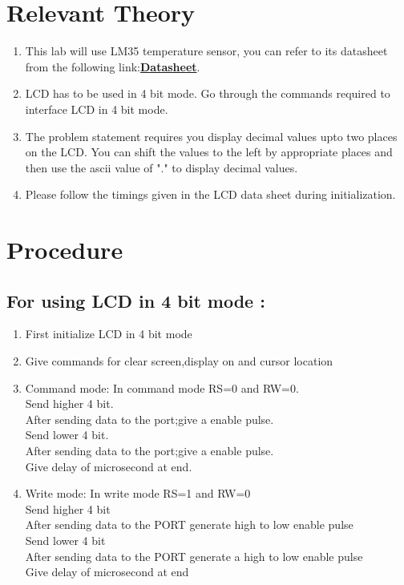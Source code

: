 \documentclass[a4paper,12pt,oneside]{book}
\begin{document}
\section {Relevant Theory}
\begin{enumerate}
\item This lab will use LM35 temperature sensor, you can refer to its datasheet from the following link:\href{http://www.ti.com/product/LM35/datasheet}{\textbf{Datasheet}}.
\item 
LCD has to be used in 4 bit mode. Go through the commands required to interface LCD in 4 bit mode.
\item 
The problem statement requires you display decimal values upto two places on the LCD. You can shift the values to the left by appropriate places and then use the ascii value of "." to display decimal values.  
\item 
Please follow the timings given in the LCD data sheet during initialization. 
\end{enumerate}


\section {Procedure}

\subsection{For using  LCD in 4 bit mode :}
\begin{enumerate}
\item First initialize LCD in 4 bit mode
\item Give commands for clear screen,display on and cursor location
\item Command mode:
 In command mode RS=0 and RW=0. \\
 Send higher 4 bit.\\
After sending data to the port;give a enable pulse.\\
 Send lower 4 bit.\\
 After sending data to the port;give a enable pulse.\\
 Give delay of microsecond at end.
\item Write mode:
In write mode RS=1 and RW=0\\
Send higher 4 bit\\ 
After sending data to the PORT generate high to low enable pulse \\
Send lower 4 bit\\ 
After sending data to the PORT generate a high to low enable pulse \\
Give delay of microsecond at end\\
\end{enumerate}
\end{document}
